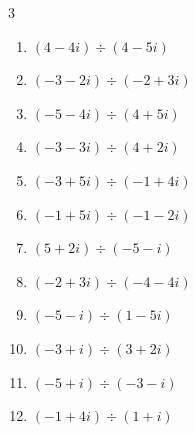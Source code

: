 \begin{multicols}{3}
\begin{enumerate}

  \item $\displaystyle (4-4i)\div(4-5i)$


  \item $\displaystyle (-3-2i)\div(-2+3i)$

        \phantom{$\displaystyle =i$}

  \item $\displaystyle (-5-4i)\div(4+5i)$


  \item $\displaystyle (-3-3i)\div(4+2i)$


  \item $\displaystyle (-3+5i)\div(-1+4i)$


  \item $\displaystyle (-1+5i)\div(-1-2i)$


  \item $\displaystyle (5+2i)\div(-5-i)$


  \item $\displaystyle (-2+3i)\div(-4-4i)$


  \item $\displaystyle (-5-i)\div(1-5i)$

        \phantom{$\displaystyle =-i$}

\columnbreak %

  \item $\displaystyle (-3+i)\div(3+2i)$


  \item $\displaystyle (-5+i)\div(-3-i)$


  \item $\displaystyle (-1+4i)\div(1+i)$


\end{enumerate}
\end{multicols}
